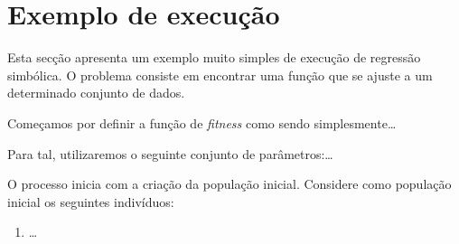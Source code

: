 \section{Exemplo de execução}
\label{sec:2exemplo}

Esta secção apresenta um exemplo muito simples de execução de regressão simbólica. O problema consiste em encontrar uma função
que se ajuste a um determinado conjunto de dados.

Começamos por definir a função de \emph{fitness} como sendo simplesmente\ldots

Para tal, utilizaremos o seguinte conjunto de parâmetros:\ldots

O processo inicia com a criação da população inicial. Considere como população inicial os seguintes indivíduos:
\begin{enumerate}
  \item {\ldots}
\end{enumerate}
